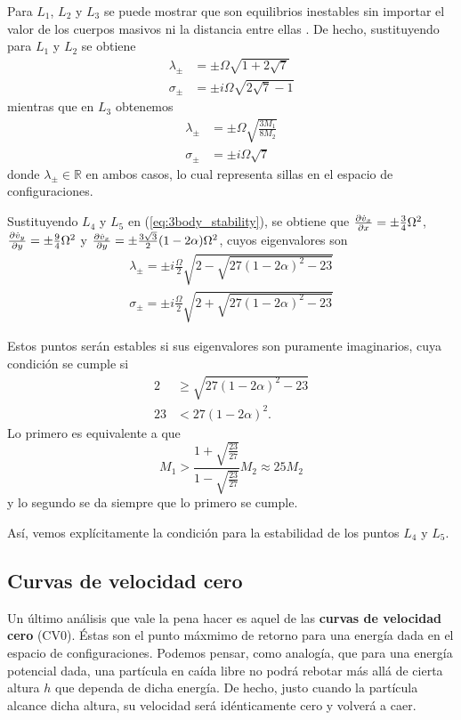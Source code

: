Para $L_1$, $L_2$ y $L_3$ se puede mostrar que son equilibrios inestables sin importar el valor de los cuerpos masivos ni la distancia entre ellas \cite{algo}. De hecho, sustituyendo para $L_1$ y $L_2$ se obtiene
\begin{align*}
 \lambda_\pm &= \pm \Omega \sqrt{1 + 2\sqrt{7}} \\
 \sigma_\pm &= \pm i \Omega \sqrt{2\sqrt{7} - 1}
\end{align*}
mientras que en $L_3$ obtenemos 
\begin{align*}
 \lambda_\pm &= \pm \Omega \sqrt{ \frac{3M_1}{8M_2} } \\
 \sigma_\pm &= \pm i \Omega \sqrt{7}
\end{align*}
donde $\lambda_\pm \in \mathbb{R}$ en ambos casos, lo cual representa sillas en el espacio de configuraciones.

Sustituyendo $L_4$ y $L_5$ en (\ref{eq:3body_stability}), se obtiene que $\frac{\partial \dot{v}_x}{\partial x} = \pm \frac{3}{4}\Omega^2$, $\frac{\partial \dot{v}_y}{\partial y} = \pm \frac{9}{4}\Omega^2$ y $\frac{\partial \dot{v}_x}{\partial y} = \pm \frac{3\sqrt{3}}{2} (1-2\alpha) \Omega^2$, cuyos eigenvalores son
\begin{align*}
 \lambda_\pm = \pm i \frac{\Omega}{2} \sqrt{ 2 - \sqrt{27(1-2\alpha)^2 - 23} } \\
 \sigma_\pm = \pm i \frac{\Omega}{2} \sqrt{ 2 + \sqrt{27(1-2\alpha)^2 - 23} } 
 \end{align*}

Estos puntos serán estables si sus eigenvalores son puramente imaginarios, cuya condición se cumple si 
\begin{align*}
 2 &\geq \sqrt{27(1-2\alpha)^2 - 23} \\
 23 &< 27(1-2\alpha)^2.
\end{align*}
Lo primero es equivalente a que 
\begin{equation}
 M_1 > \frac{1 + \sqrt{\frac{23}{27}} }{1 - \sqrt{\frac{23}{27}}}M_2 \approx 25M_2
\end{equation}
y lo segundo se da siempre que lo primero se cumple. 

Así, vemos explícitamente la condición para la estabilidad de los puntos $L_4$ y $L_5$. 

\subsection{Curvas de velocidad cero}
\label{sec:zvc}

Un último análisis que vale la pena hacer es aquel de las \textbf{curvas de velocidad cero} (CV0). Éstas son el punto máxmimo de retorno para una energía dada en el espacio de configuraciones. Podemos pensar, como analogía, que para una energía potencial dada, una partícula en caída libre no podrá rebotar más allá de cierta altura $h$ que dependa de dicha energía. De hecho, justo cuando la partícula alcance dicha altura, su velocidad será idénticamente cero y volverá a caer. 

